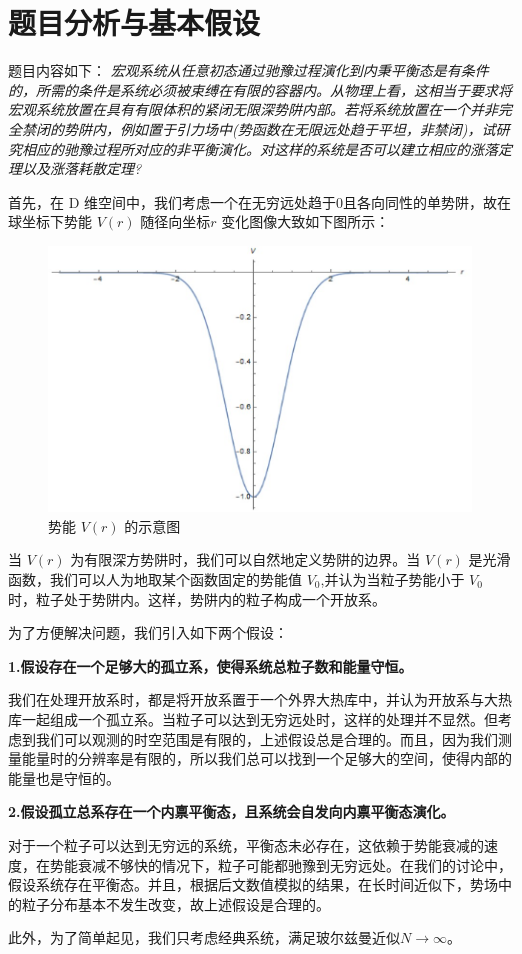 \section{题目分析与基本假设}
题目内容如下：
\textit{
    宏观系统从任意初态通过驰豫过程演化到内秉平衡态是有条件的，所需的条件是系统必须被束缚在有限的容器内。从物理上看，这相当于要求将宏观系统放置在具有有限体积的紧闭无限深势阱内部。若将系统放置在一个并非完全禁闭的势阱内，例如置于引力场中(势函数在无限远处趋于平坦，非禁闭)，试研究相应的驰豫过程所对应的非平衡演化。对这样的系统是否可以建立相应的涨落定理以及涨落耗散定理?
    }

首先，在  D  维空间中，我们考虑一个在无穷远处趋于0且各向同性的单势阱，故在球坐标下势能  $V(r)$  随径向坐标$r$  变化图像大致如下图所示：
\begin{figure}[htbp]
  \centering
  \includegraphics[width=0.8\linewidth]{figs/potential.jpg}
  \caption{势能  $V(r)$  的示意图}
\end{figure}

当  $V(r)$  为有限深方势阱时，我们可以自然地定义势阱的边界。当  $V(r)$  是光滑函数，我们可以人为地取某个函数固定的势能值  $V_{0}$,并认为当粒子势能小于  $V_{0}$  时，粒子处于势阱内。这样，势阱内的粒子构成一个开放系。

为了方便解决问题，我们引入如下两个假设：

\textbf{1.假设存在一个足够大的孤立系，使得系统总粒子数和能量守恒。}

我们在处理开放系时，都是将开放系置于一个外界大热库中，并认为开放系与大热库一起组成一个孤立系。当粒子可以达到无穷远处时，这样的处理并不显然。但考虑到我们可以观测的时空范围是有限的，上述假设总是合理的。而且，因为我们测量能量时的分辨率是有限的，所以我们总可以找到一个足够大的空间，使得内部的能量也是守恒的。

\textbf{2.假设孤立总系存在一个内禀平衡态，且系统会自发向内禀平衡态演化。}

对于一个粒子可以达到无穷远的系统，平衡态未必存在，这依赖于势能衰减的速度，在势能衰减不够快的情况下，粒子可能都驰豫到无穷远处。在我们的讨论中，假设系统存在平衡态。并且，根据后文数值模拟的结果，在长时间近似下，势场中的粒子分布基本不发生改变，故上述假设是合理的。

此外，为了简单起见，我们只考虑经典系统，满足玻尔兹曼近似$N\rightarrow\infty$。